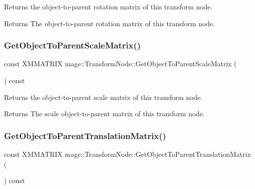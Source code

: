 Returns the object-\/to-\/parent rotation matrix of this transform node.

\begin{DoxyReturn}{Returns}
The object-\/to-\/parent rotation matrix of this transform node. 
\end{DoxyReturn}
\hypertarget{structmage_1_1_transform_node_a0abee6b9b77888cd5ca44060256a33c7}{}\label{structmage_1_1_transform_node_a0abee6b9b77888cd5ca44060256a33c7} 
\subsubsection{\texorpdfstring{Get\+Object\+To\+Parent\+Scale\+Matrix()}{GetObjectToParentScaleMatrix()}}
{\footnotesize\ttfamily const X\+M\+M\+A\+T\+R\+IX mage\+::\+Transform\+Node\+::\+Get\+Object\+To\+Parent\+Scale\+Matrix (\begin{DoxyParamCaption}{ }\end{DoxyParamCaption}) const\hspace{0.3cm}{\ttfamily [noexcept]}}

Returns the object-\/to-\/parent scale matrix of this transform node.

\begin{DoxyReturn}{Returns}
The scale object-\/to-\/parent matrix of this transform node. 
\end{DoxyReturn}
\hypertarget{structmage_1_1_transform_node_a32c025e3ded200decae648f7e249dfe2}{}\label{structmage_1_1_transform_node_a32c025e3ded200decae648f7e249dfe2} 
\subsubsection{\texorpdfstring{Get\+Object\+To\+Parent\+Translation\+Matrix()}{GetObjectToParentTranslationMatrix()}}
{\footnotesize\ttfamily const X\+M\+M\+A\+T\+R\+IX mage\+::\+Transform\+Node\+::\+Get\+Object\+To\+Parent\+Translation\+Matrix (\begin{DoxyParamCaption}{ }\end{DoxyParamCaption}) const\hspace{0.3cm}{\ttfamily [noexcept]}}


